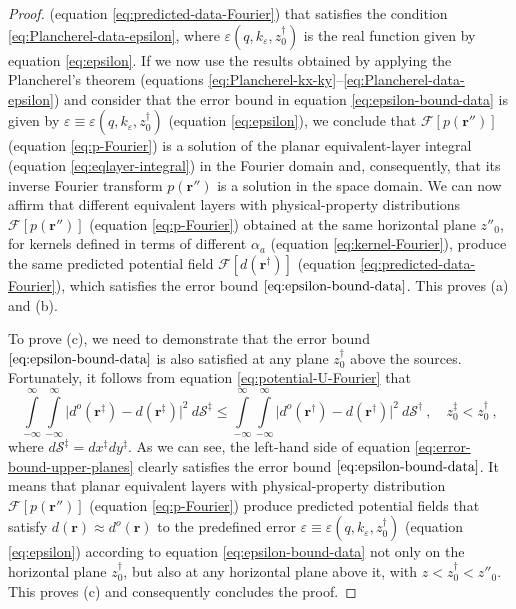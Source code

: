 \begin{proof}
	(equation \ref{eq:predicted-data-Fourier}) that satisfies the condition 
	\ref{eq:Plancherel-data-epsilon}, where $\varepsilon(q, k_{\varepsilon}, z^{\dagger}_{0})$ 
	is the real function given by equation \ref{eq:epsilon}.
	If we now use the results obtained by applying the Plancherel's theorem 
	(equations \ref{eq:Plancherel-kx-ky}--\ref{eq:Plancherel-data-epsilon}) and 
	consider that the error bound in equation \ref{eq:epsilon-bound-data} is given by 
	$\varepsilon \equiv \varepsilon(q, k_{\varepsilon}, z^{\dagger}_{0})$ (equation \ref{eq:epsilon}),
	we conclude that $\mathcal{F} [ p(\mathbf{r}'') ]$ (equation \ref{eq:p-Fourier}) is a solution
	of the planar equivalent-layer integral (equation \ref{eq:eqlayer-integral}) in the Fourier domain
	and, consequently, that its inverse Fourier transform $p(\mathbf{r}'')$ is a solution in the
	space domain.
	We can now affirm that different equivalent layers with physical-property distributions 
	$\mathcal{F} [ p(\mathbf{r}'')]$ (equation \ref{eq:p-Fourier}) obtained at the same horizontal plane $z''_{0}$, 
	for kernels defined in terms of different $\alpha_{a}$ (equation \ref{eq:kernel-Fourier}),
	produce the same predicted potential field $\mathcal{F} [ d(\mathbf{r}^{\dagger}) ]$ (equation \ref{eq:predicted-data-Fourier}),
	which satisfies the error bound $\ref{eq:epsilon-bound-data}$.
	This proves (a) and (b). 
	
	To prove (c), we need to demonstrate that the error bound $\ref{eq:epsilon-bound-data}$ is also 
	satisfied at any plane $z^{\dagger}_{0}$ above the sources.
	Fortunately, it follows from equation \ref{eq:potential-U-Fourier} that
	\begin{equation}
		\int\limits_{-\infty}^{\infty} \int\limits_{-\infty}^{\infty}
		\vert d^{o}(\mathbf{r}^{\ddagger}) - d(\mathbf{r}^{\ddagger})
		\vert^{2} \: d\mathcal{S}^{\ddagger} \le
		\int\limits_{-\infty}^{\infty} \int\limits_{-\infty}^{\infty}
		\vert d^{o}(\mathbf{r}^{\dagger}) - d(\mathbf{r}^{\dagger})
		\vert^{2} \: d\mathcal{S}^{\dagger} \: ,
		\quad z^{\ddagger}_{0} < z^{\dagger}_{0} \: ,
		\label{eq:error-bound-upper-planes}
	\end{equation}
	where $d\mathcal{S}^{\ddagger} = dx^{\ddagger}dy^{\ddagger}$.
	As we can see, the left-hand side of equation \ref{eq:error-bound-upper-planes} clearly satisfies
	the error bound $\ref{eq:epsilon-bound-data}$.
	It means that 
	planar equivalent layers with physical-property distribution $\mathcal{F} [ p(\mathbf{r}'') ]$ 
	(equation \ref{eq:p-Fourier}) produce predicted potential fields that satisfy 
	$d(\mathbf{r}) \approx d^{o}(\mathbf{r})$ to the 
	predefined error $\varepsilon \equiv \varepsilon(q, k_{\varepsilon}, z^{\dagger}_{0})$ 
	(equation \ref{eq:epsilon}) according to equation \ref{eq:epsilon-bound-data} not only on the 
	horizontal plane $z^{\dagger}_{0}$, but also at any horizontal plane above it, 
	with $z < z^{\dagger}_{0} < z''_{0}$.
	This proves (c) and consequently concludes the proof.
\end{proof}

